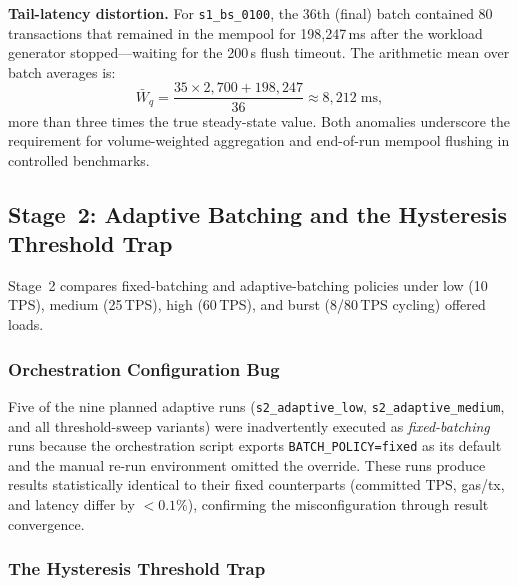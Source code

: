 \textbf{Tail-latency distortion.}
For \texttt{s1\_bs\_0100}, the 36th (final) batch contained 80 transactions
that remained in the mempool for 198{,}247\,ms after the workload generator
stopped---waiting for the 200\,s flush timeout.  The arithmetic mean over
batch averages is:
\begin{equation}
  \bar{W}_q = \frac{35 \times 2{,}700 + 198{,}247}{36} \approx 8{,}212\;\text{ms},
\end{equation}
more than three times the true steady-state value.
Both anomalies underscore the requirement for volume-weighted aggregation and
end-of-run mempool flushing in controlled benchmarks.

\subsection{Stage~2: Adaptive Batching and the Hysteresis Threshold Trap}
\label{sec:stage2}

Stage~2 compares fixed-batching and adaptive-batching policies under low
(10\,TPS), medium (25\,TPS), high (60\,TPS), and burst (8/80\,TPS cycling)
offered loads.

\subsubsection{Orchestration Configuration Bug}

Five of the nine planned adaptive runs (\texttt{s2\_adaptive\_low},
\texttt{s2\_adaptive\_medium}, and all threshold-sweep variants) were
inadvertently executed as \emph{fixed-batching} runs because the orchestration
script exports \texttt{BATCH\_POLICY=fixed} as its default and the manual
re-run environment omitted the override.  These runs produce results
statistically identical to their fixed counterparts (committed TPS, gas/tx, and
latency differ by $<0.1\%$), confirming the misconfiguration through result
convergence.

\subsubsection{The Hysteresis Threshold Trap}

